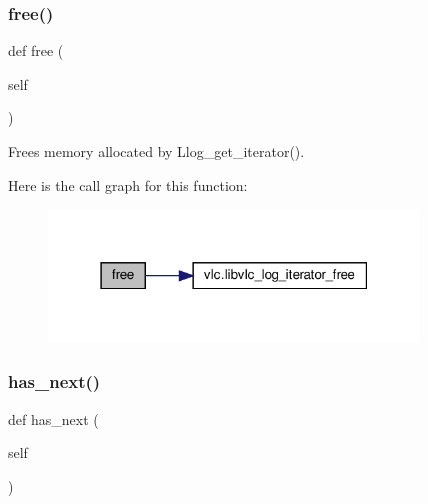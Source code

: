 \subsubsection{\texorpdfstring{free()}{free()}}
{\footnotesize\ttfamily def free (\begin{DoxyParamCaption}\item[{}]{self }\end{DoxyParamCaption})}

\begin{DoxyVerb}Frees memory allocated by L{log_get_iterator}().
\end{DoxyVerb}
 Here is the call graph for this function\+:
\nopagebreak
\begin{figure}[H]
\begin{center}
\leavevmode
\includegraphics[width=279pt]{classvlc_1_1_log_iterator_abc0100ebe0f74d4c2e0da92529c2890b_cgraph}
\end{center}
\end{figure}
\mbox{\label{classvlc_1_1_log_iterator_aa8de9cca1082708d185d2850c9f2a29a}} 
\subsubsection{\texorpdfstring{has\+\_\+next()}{has\_next()}}
{\footnotesize\ttfamily def has\+\_\+next (\begin{DoxyParamCaption}\item[{}]{self }\end{DoxyParamCaption})}

